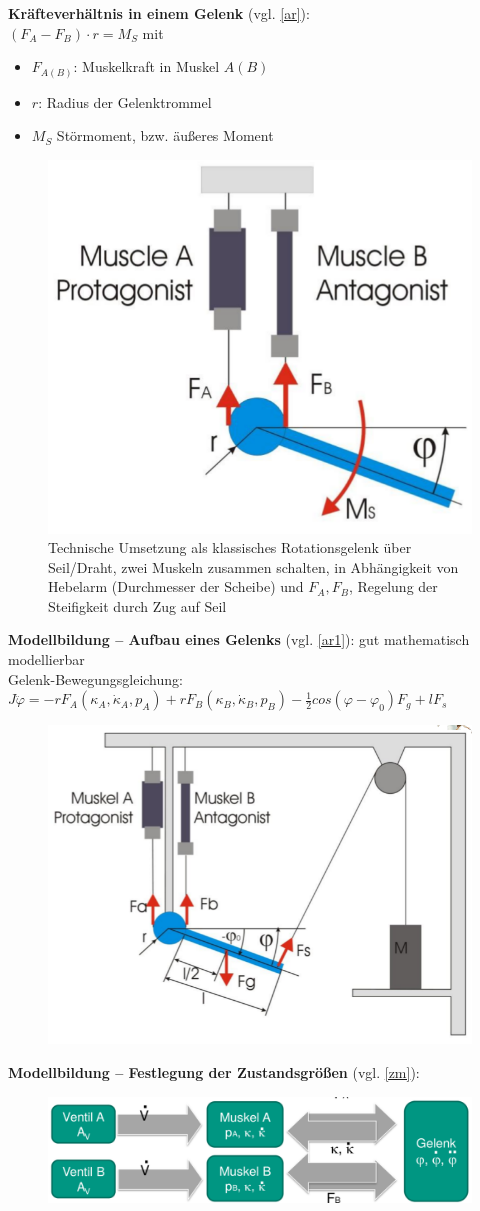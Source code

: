 \newpage
\noindent
\textbf{Kräfteverhältnis in einem Gelenk} (vgl. \autoref{ar}):\\
$(F_A - F_B)\cdot r = M_S$ mit
\begin{itemize}
\item $F_{A(B)}$: Muskelkraft in Muskel $A(B)$
\item $r$: Radius der Gelenktrommel
\item $M_S$ Störmoment, bzw. äußeres Moment
\end{itemize}
\begin{figure}[h!]
	\centering
	\includegraphics[width=0.4\linewidth]{figures/ch03_antagonistische-regelung.png}
	\caption{Technische Umsetzung als klassisches Rotationsgelenk über Seil/Draht, zwei Muskeln zusammen schalten, in Abhängigkeit von Hebelarm (Durchmesser der Scheibe)
und $F_A, F_B$,  Regelung der Steifigkeit durch Zug auf Seil}
	\label{ar}
\end{figure}
\textbf{Modellbildung -- Aufbau eines Gelenks} (vgl. \autoref{ar1}): gut mathematisch modellierbar\\
Gelenk-Bewegungsgleichung: $J\ddot{\varphi} = -rF_{A}(\kappa_A, \dot{\kappa}_A, p_A)+rF_B(\kappa_B, \dot{\kappa}_B, p_B)-\frac{1}{2}cos(\varphi - \varphi_0)F_g+lF_s$
\begin{figure}[h!]
	\centering
	\includegraphics[width=0.4\linewidth]{figures/ch03_antagonistische-regelung1.png}
	\caption{}
	\label{ar1}
\end{figure}
\newpage
\textbf{Modellbildung -- Festlegung der Zustandsgrößen} (vgl. \autoref{zm}): 
\begin{figure}[h!]
	\centering
	\includegraphics[width=0.4\linewidth]{figures/ch03_zwei-muskeln.png}
	\caption{}
	\label{zm}
\end{figure}
